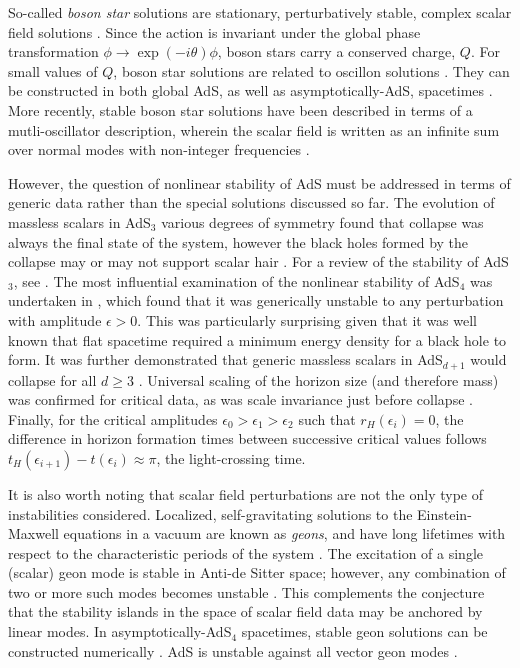 \documentclass[../PhD.tex]{subfiles}
\begin{document}
So-called \emph{boson star} solutions are stationary, perturbatively stable, complex scalar field solutions \cite{gr-qc/0309131}. Since the \ads action is invariant under the global phase transformation $\phi \to \exp(-i\theta) \phi$, boson stars carry a conserved charge, $Q$. For small values of $Q$, boson star solutions are related to oscillon solutions \cite{1304.4166}. They can be constructed in both global AdS, as well as asymptotically-AdS, spacetimes \cite{1209.2378}. More recently, stable boson star solutions have been described in terms of a mutli-oscillator description, wherein the scalar field is written as an infinite sum over normal modes with non-integer frequencies \cite{1904.02168}.

However, the question of nonlinear stability of AdS must be addressed in terms of generic data rather than the special solutions discussed so far. The evolution of massless scalars in AdS$_3$ various degrees of symmetry found that collapse was always the final state of the system, however the black holes formed by the collapse may or may not support scalar hair \cite{gr-qc/0007008, gr-qc/0008060, 1303.3186, 1211.7076}. For a review of the stability of AdS$_3$, see \cite{1311.7409}. The most influential examination of the nonlinear stability of AdS$_4$ was undertaken in \cite{1104.3702}, which found that it was generically unstable to any perturbation with amplitude $\epsilon > 0$. This was particularly surprising given that it was well known that flat spacetime required a minimum energy density for a black hole to form. It was further demonstrated that generic massless scalars in AdS$_{d+1}$ would collapse for all $d \geq 3$ \cite{1106.2339, 1108.4539}. Universal scaling of the horizon size (and therefore mass) was confirmed for critical data, as was scale invariance just before collapse \cite{1110.5823, 1504.05203}. Finally, for the critical amplitudes {$\epsilon_0 > \epsilon_1 > \epsilon_2$} such that $r_H(\epsilon_i) = 0$, the difference in horizon formation times between successive critical values follows {$t_H(\epsilon_{i+1}) - t(\epsilon_i) \approx \pi$}, the light-crossing time.


It is also worth noting that scalar field perturbations are not the only type of instabilities considered. Localized, self-gravitating solutions to the Einstein-Maxwell equations in a vacuum are known as \emph{geons}, and have long lifetimes with respect to the characteristic periods of the system \cite{Wheeler:1955zz}. The excitation of a single (scalar) geon mode is stable in Anti-de Sitter space; however, any combination of two or more such modes becomes unstable \cite{1109.1825}. This complements the conjecture that the stability islands in the space of scalar field data may be anchored by linear modes. In asymptotically-AdS$_4$ spacetimes, stable geon solutions can be constructed numerically \cite{1701.09100, 1701.07804}. AdS is unstable against all vector geon modes \cite{1408.5906}.
\end{document}
